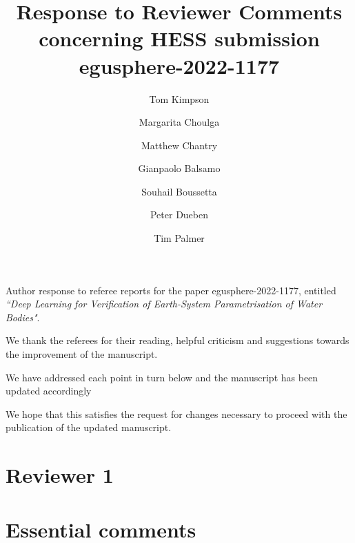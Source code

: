 \documentclass[10pt]{article}
\author{Tom Kimpson \\ 
	\and Margarita Choulga\\ 
 \and Matthew Chantry\\
\and Gianpaolo Balsamo\\  
 \and Souhail Boussetta\\
  \and Peter Dueben\\
   \and Tim Palmer\\
}
\title{\normalsize Response to Reviewer  Comments
  concerning HESS submission egusphere-2022-1177}
\begin{document}
	\maketitle
\noindent Author response to referee reports for the paper egusphere-2022-1177,
entitled \textit{``Deep Learning for Verification of Earth-System Parametrisation of Water Bodies"}. \newline 

\noindent We thank the referees for their reading, helpful criticism and suggestions towards the improvement of the manuscript. \newline 

\noindent We have addressed each point in turn below and the manuscript has been updated accordingly \newline 

\noindent  We hope that this satisfies the request for changes necessary to proceed with the publication of the updated manuscript. \newline 





\section{Reviewer 1}


\section*{Essential comments}
\end{document}
